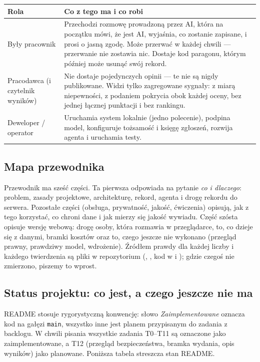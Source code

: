 \begin{tabularx}{\linewidth}{@{}lX@{}}
\toprule
Rola & Co z tego ma i co robi \\
\midrule
Były pracownik &
Przechodzi rozmowę prowadzoną przez AI, która na początku mówi, że jest AI,
wyjaśnia, co zostanie zapisane, i prosi o jasną zgodę. Może przerwać w każdej
chwili --- przerwanie nie zostawia nic. Dostaje kod paragonu, którym później
może usunąć swój rekord. \\
Pracodawca (i czytelnik wyników) &
Nie dostaje pojedynczych opinii --- te nie są nigdy publikowane. Widzi tylko
zagregowane sygnały: z miarą niepewności, z podaniem pokrycia obok każdej oceny,
bez jednej łącznej punktacji i bez rankingu. \\
Deweloper / operator &
Uruchamia system lokalnie (jedno polecenie), podpina model, konfiguruje
tożsamość i księgę zgłoszeń, rozwija agenta i uruchamia testy. \\
\bottomrule
\end{tabularx}

\subsection{Mapa przewodnika}

Przewodnik ma sześć części. Ta pierwsza odpowiada na pytanie \emph{co i dlaczego}:
problem, zasady projektowe, architekturę, rekord, agenta i drogę rekordu do
serwera. Pozostałe części (obsługa, prywatność, jakość, ćwiczenia) opisują, jak z tego
korzystać, co chroni dane i jak mierzy się jakość wywiadu. Część szósta opisuje
wersję webową: drogę osoby, która rozmawia w przeglądarce, to, co dzieje się z danymi,
bramki kosztów oraz to, czego jeszcze nie wykonano (przegląd prawny, prawdziwy model, wdrożenie). Źródłem prawdy dla
każdej liczby i każdego twierdzenia są pliki w repozytorium (,
, kod w  i ); gdzie czegoś nie
zmierzono, piszemy to wprost.

\subsection{Status projektu: co jest, a czego jeszcze nie ma}

README stosuje rygorystyczną konwencję: słowo \emph{Zaimplementowane} oznacza
kod na gałęzi \texttt{main}, wszystko inne jest planem przypisanym do zadania
z backlogu. W chwili pisania wszystkie zadania T0--T11 są oznaczone jako
zaimplementowane, a T12 (przegląd bezpieczeństwa, bramka wydania, opis wyników)
jako planowane. Poniższa tabela streszcza stan README.

